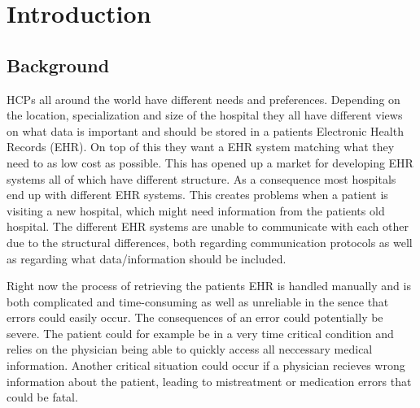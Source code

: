 \documentclass[14pt]{article}
\begin{document}
\section{Introduction}
\label{sec:Introduction}

\subsection{Background}

\glspl{HCP} all around the world have different needs and preferences. Depending on the location, specialization and size of the hospital they all have different views on what data is important and should be stored in a patients Electronic Health Records (EHR). On top of this they want a EHR system matching what they need to as low cost as possible. This has opened up a market for developing EHR systems all of which have different structure. As a consequence most hospitals end up with different EHR systems. This creates problems when a patient is visiting a new hospital, which might need information from the patients old hospital. The different EHR systems are unable to communicate with each other due to the structural differences, both regarding communication protocols as well as regarding what data/information should be included. 

Right now the process of retrieving the patients EHR is handled manually \cite{DataInsp} 
and is both complicated and time-consuming as well as unreliable in the sence that errors could easily occur. The consequences of an error could potentially be severe. The patient could for example be in a very time critical condition and relies on the physician being able to quickly access all neccessary medical information. Another critical situation could occur if a physician recieves wrong information about the patient, leading to mistreatment or medication errors that could be fatal.
\end{document}
